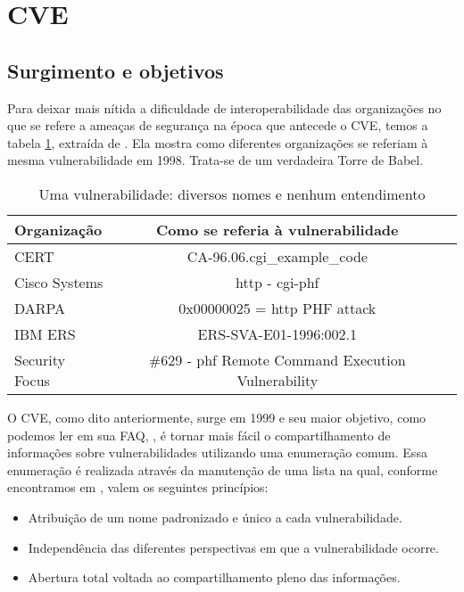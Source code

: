 	\section{CVE}
	\label{sec:cve}

		\subsection{Surgimento e objetivos}
			Para deixar mais nítida a dificuldade de interoperabilidade
			das organizações no que se refere a ameaças de segurança na época
			que antecede o CVE, temos a tabela \ref{tab:torre_babel}, extraída de \cite{Martin2001}.
			Ela	mostra como diferentes organizações se referiam à mesma vulnerabilidade
			em 1998. Trata-se de um verdadeira Torre de Babel.

			\begin{table}
				\begin{tabular}{|l|c|c|}
					\hline
						\textbf{Organização} & \textbf{Como se referia à vulnerabilidade}\\
					\hline
						CERT\footnotemark[1] & CA-96.06.cgi\_example\_code\\
					\hline
						Cisco Systems\footnotemark[2] & http - cgi-phf\\
					\hline
						DARPA & 0x00000025 = http PHF attack\\	
					\hline
						IBM ERS & ERS-SVA-E01-1996:002.1\\	
					\hline
						Security Focus\footnotemark[3] & \#629 - phf Remote Command Execution Vulnerability\\	
					\hline
				\end{tabular}
				\caption{Uma vulnerabilidade: diversos nomes e nenhum entendimento}\label{tab:torre_babel}
			\end{table}
			

			O CVE, como dito anteriormente, surge em 1999 e seu maior objetivo, como podemos
			ler em sua FAQ, \cite{CVE2010}, é tornar mais fácil
			o compartilhamento de informações sobre vulnerabilidades utilizando uma enumeração comum.
			Essa enumeração é realizada através da manutenção de uma lista na qual, conforme
			encontramos em \cite{Santos2004}, valem os seguintes princípios:
			\begin{itemize}
				\item{Atribuição de um nome padronizado e único a cada vulnerabilidade.}
				\item{Independência das diferentes perspectivas em que a vulnerabilidade ocorre.}
				\item{Abertura total voltada ao compartilhamento pleno das informações.}
			\end{itemize}


